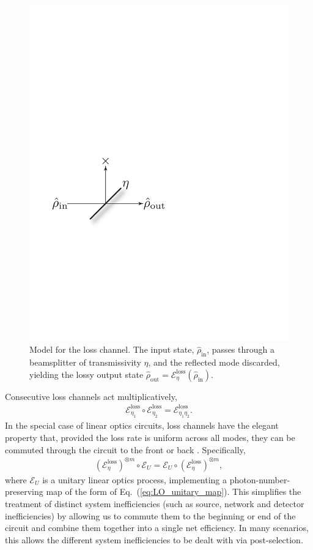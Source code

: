 \documentclass[aps, rmp, twocolumn, amsmath, amssymb, nofootinbib, superscriptaddress, longbibliography, floatfix, table-of-contents, eqsecnum]{revtex4-1}
\begin{document}
\begin{figure}[!htb]
	\includegraphics[width=0.5\columnwidth]{loss_model}
	\caption{Model for the loss channel. The input state, $\hat\rho_\text{in}$, passes through a beamsplitter of transmissivity $\eta$, and the reflected mode discarded, yielding the lossy output state \mbox{$\hat\rho_\text{out} = \mathcal{E}^\text{loss}_\eta(\hat\rho_\text{in})$}.} \label{fig:loss_model} 
\end{figure}

Consecutive loss channels act multiplicatively,
\begin{align}
\mathcal{E}_{\eta_1}^\text{loss} \circ \mathcal{E}_{\eta_2}^\text{loss} = \mathcal{E}_{\eta_1 \eta_2}^\text{loss}.
\end{align}
In the special case of linear optics circuits, loss channels have the elegant property that, provided the loss rate is uniform across all modes, they can be commuted through the circuit to the front or back \cite{???}. Specifically,
\begin{align}
(\mathcal{E}_{\eta}^\text{loss})^{\otimes m} \circ \mathcal{E}_U = \mathcal{E}_U \circ (\mathcal{E}_{\eta}^\text{loss})^{\otimes m},
\end{align}
where $\mathcal{E}_U$ is a unitary linear optics process, implementing a photon-number-preserving map of the form of Eq.~(\ref{eq:LO_unitary_map}). This simplifies the treatment of distinct system inefficiencies (such as source, network and detector inefficiencies) by allowing us to commute them to the beginning or end of the circuit and combine them together into a single net efficiency. In many scenarios, this allows the different system inefficiencies to be dealt with via post-selection.
\end{document}

